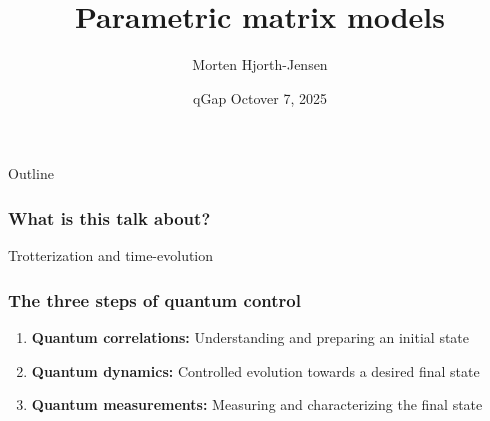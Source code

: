 \documentclass{beamer}
\begin{document}
\begin{frame}
\title[Quantum Computing and ML]{\textbf{Parametric matrix models}}
\author{Morten Hjorth-Jensen}
\date{qGap Octover 7, 2025}
\titlepage
\end{frame}



\begin{frame}{Outline}
\tableofcontents
\end{frame}


\begin{frame}
\frametitle{What is this talk about?}

\begin{block}{Trotterization and time-evolution}


\end{block}

\end{frame}

\begin{frame}
\frametitle{The three steps of quantum control}
\begin{enumerate}
\item {\bf Quantum correlations:} Understanding and preparing an initial state
\item {\bf Quantum dynamics:} Controlled evolution towards a desired final state
\item {\bf Quantum measurements:} Measuring and characterizing the final state
\end{enumerate}
\end{frame}

\end{document}
